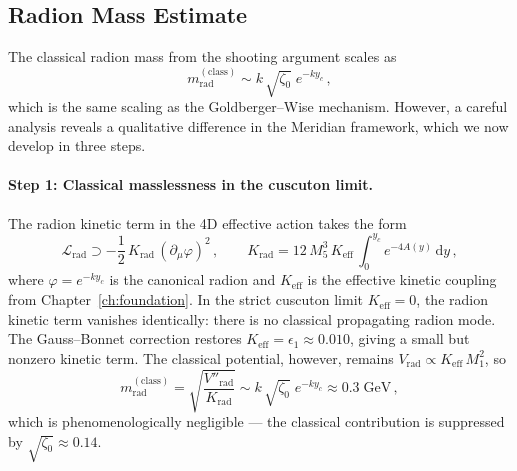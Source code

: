 \subsection{Radion Mass Estimate}

The classical radion mass from the shooting argument scales as
\begin{equation}
  m_{\mathrm{rad}}^{(\mathrm{class})} \sim k\,\sqrt{\zeta_0}\;e^{-ky_c}\,,
\end{equation}
which is the same scaling as the Goldberger--Wise mechanism. However, a careful analysis reveals a qualitative difference in the Meridian framework, which we now develop in three steps.

\paragraph{Step 1: Classical masslessness in the cuscuton limit.}
The radion kinetic term in the 4D effective action takes the form
\begin{equation}
  \mathcal{L}_{\mathrm{rad}} \supset -\frac{1}{2}\,K_{\mathrm{rad}}\,(\partial_\mu \varphi)^2\,, \qquad
  K_{\mathrm{rad}} = 12\,M_5^3\,K_{\mathrm{eff}}\,\int_0^{y_c} e^{-4A(y)}\,\mathrm{d}y\,,
\end{equation}
where $\varphi = e^{-ky_c}$ is the canonical radion and $K_{\mathrm{eff}}$ is the effective kinetic coupling from Chapter~\ref{ch:foundation}.  In the strict cuscuton limit $K_{\mathrm{eff}} = 0$, the radion kinetic term vanishes identically: there is no classical propagating radion mode.  The Gauss--Bonnet correction restores $K_{\mathrm{eff}} = \epsilon_1 \approx 0.010$, giving a small but nonzero kinetic term.  The classical potential, however, remains $V_{\mathrm{rad}} \propto K_{\mathrm{eff}}\,M_1^2$, so
\begin{equation}
  m_{\mathrm{rad}}^{(\mathrm{class})} = \sqrt{\frac{V''_{\mathrm{rad}}}{K_{\mathrm{rad}}}} \sim k\,\sqrt{\zeta_0}\;e^{-ky_c} \approx 0.3\;\mathrm{GeV}\,,
\end{equation}
which is phenomenologically negligible --- the classical contribution is suppressed by $\sqrt{\zeta_0} \approx 0.14$.

